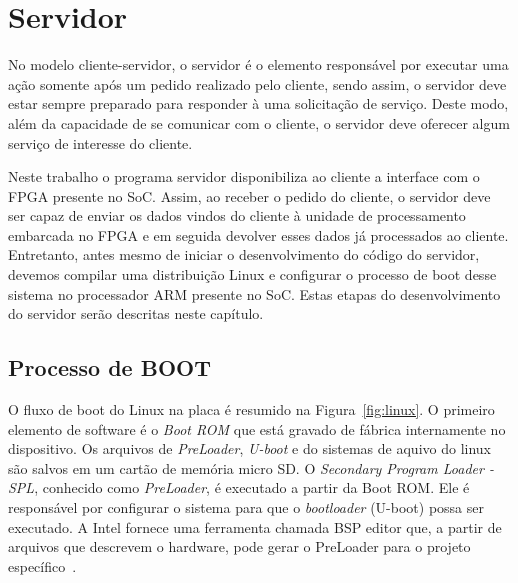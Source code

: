 \chapter{Servidor}\label{cap:server}

No modelo cliente-servidor, o servidor é o elemento responsável por executar uma ação somente após um pedido realizado pelo cliente, sendo assim, o servidor deve estar sempre preparado para responder à uma solicitação de serviço. Deste modo, além da capacidade de se comunicar com o cliente, o servidor deve oferecer algum serviço de interesse do cliente. 

Neste trabalho o programa servidor disponibiliza ao cliente a interface com o FPGA presente no SoC. Assim, ao receber o pedido do cliente, o servidor deve ser capaz de enviar os dados vindos do cliente à unidade de processamento embarcada no FPGA e em seguida devolver esses dados já processados ao cliente. Entretanto, antes mesmo de iniciar o desenvolvimento do código do servidor, devemos compilar uma distribuição Linux e configurar o processo de boot desse sistema no processador ARM presente no SoC. Estas etapas do desenvolvimento do servidor serão descritas neste capítulo.

\section{Processo de BOOT}
O fluxo de boot do Linux na placa é resumido na Figura~\ref{fig:linux}. O primeiro elemento de software é o \textit{Boot ROM} que está gravado de fábrica internamente no dispositivo. Os arquivos de \textit{PreLoader},\textit{ U-boot} e do sistemas de aquivo do linux são salvos em um cartão de memória micro SD\@. O \textit{Secondary Program Loader - SPL}, conhecido como \textit{PreLoader}, é executado a partir da Boot ROM\@. Ele é responsável por configurar o sistema para que o \textit{bootloader} (U-boot) possa ser executado. A Intel fornece uma ferramenta chamada BSP editor que, a partir de arquivos que descrevem o hardware, pode gerar o PreLoader para o projeto específico~\cite{SocLinux}.  

